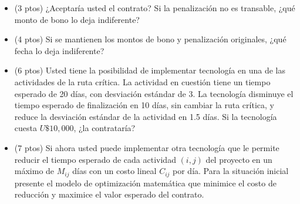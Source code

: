 \documentclass[11pt, a4paper]{article}
\begin{document}
  \begin{itemize}
    \item[\textbf{i.}] (3 ptos) ¿Aceptaría usted el contrato? Si la penalización no es transable, ¿qué monto de bono lo deja indiferente?
    \item[\textbf{ii.}] (4 ptos) Si se mantienen los montos de bono y penalización originales, ¿qué fecha lo deja indiferente?
    \item[\textbf{iii.}] (6 ptos) Usted tiene la posibilidad de implementar tecnología en una de las actividades de la ruta crítica. La actividad en cuestión tiene un tiempo esperado de 20 días, con desviación estándar de 3. La tecnología disminuye el tiempo esperado de finalización en 10 días, sin cambiar la ruta crítica, y reduce la desviación estándar de la actividad en 1.5 días. Si la tecnología cuesta $U\$10,000$, ¿la contrataría?
    \item[\textbf{iv.}] (7 ptos) Si ahora usted puede implementar otra tecnología que le permite reducir el tiempo esperado de cada actividad $(i,j)$ del proyecto en un máximo de $M_{ij}$ días con un costo lineal $C_{ij}$ por día. Para la situación inicial presente el modelo de optimización matemática que minimice el costo de reducción y maximice el valor esperado del contrato.
  \end{itemize}
\end{document}
